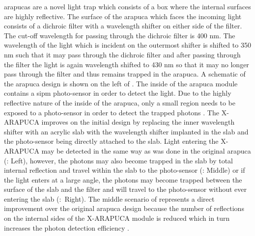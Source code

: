 \glspl{arapuca} are a novel light trap which consists of a box where the internal surfaces are highly reflective. The surface of the \gls{arapuca} which faces the incoming light consists of a dichroic filter with a wavelength shifter on either side of the filter. The cut-off wavelength for passing through the dichroic filter is 400 nm. The wavelength of the light which is incident on the outermost shifter is shifted to 350 nm such that it may pass through the dichroic filter and after passing through the filter the light is again wavelength shifted to 430 nm so that it may no longer pass through the filter and thus remains trapped in the \gls{arapuca}. A schematic of the \gls{arapuca} design is shown on the left of . The inside of the \gls{arapuca} module contains a \gls{sipm} photo-sensor in order to detect the light. Due to the highly reflective nature of the inside of the \gls{arapuca}, only a small region needs to be exposed to a photo-sensor in order to detect the trapped photons \cite{ARAPUCA}\cite{X-ARAPUCA}. The X-ARAPUCA improves on the initial design by replacing the inner wavelength shifter with an acrylic slab with the wavelength shifter implanted in the slab and the photo-sensor being directly attached to the slab. Light entering the X-ARAPUCA may be detected in the same way as was done in the original \gls{arapuca} (: Left), however, the photons may also become trapped in the slab by total internal reflection and travel within the slab to the photo-sensor (: Middle) or if the light enters at a large angle, the photons may become trapped between the surface of the slab and the filter and will travel to the photo-sensor without ever entering the slab (:~Right). The middle scenario of  represents a direct improvement over the original \gls{arapuca} design because the number of reflections on the internal sides of the X-ARAPUCA module is reduced which in turn increases the photon detection efficiency \cite{X-ARAPUCA}. 

